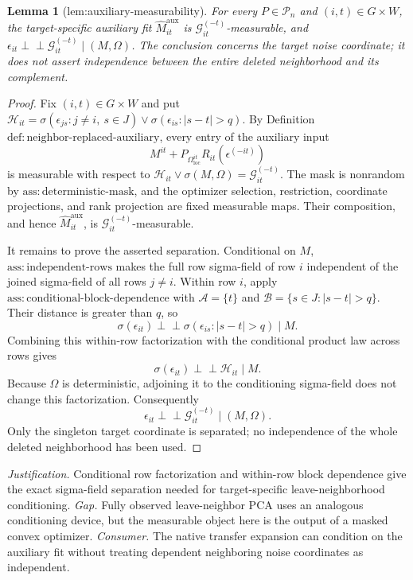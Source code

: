 \documentclass{article}
\newtheorem{lemma}{Lemma}
\begin{document}
\begin{lemma}[lem:auxiliary-measurability]\label{lem:auxiliary-measurability}
For every \(P\in\mathcal P_n\) and \((i,t)\in G\times W\), the target-specific auxiliary fit \(\widehat M^{\mathrm{aux}}_{it}\) is \(\mathcal G_{it}^{(-t)}\)-measurable, and \(\epsilon_{it}\perp\!\!\!\perp\mathcal G_{it}^{(-t)}\mid(M,\Omega)\). The conclusion concerns the target noise coordinate; it does not assert independence between the entire deleted neighborhood and its complement.
\end{lemma}
\begin{proof}
Fix \((i,t)\in G\times W\) and put \(\mathcal H_{it}=\sigma(\epsilon_{js}:j\ne i,\ s\in J)\vee\sigma(\epsilon_{is}:|s-t|>q)\).  By Definition \(\mathrm{def:neighbor\mbox{-}replaced\mbox{-}auxiliary}\), every entry of the auxiliary input
\[
 M^{it}+P_{\Omega_{\mathrm{loc}}^{it}}R_{it}(\epsilon^{(-it)})
\]
is measurable with respect to \(\mathcal H_{it}\vee\sigma(M,\Omega)=\mathcal G_{it}^{(-t)}\).  The mask is nonrandom by \(\mathrm{ass:deterministic\mbox{-}mask}\), and the optimizer selection, restriction, coordinate projections, and rank projection are fixed measurable maps.  Their composition, and hence \(\widehat M^{\mathrm{aux}}_{it}\), is \(\mathcal G_{it}^{(-t)}\)-measurable.

It remains to prove the asserted separation.  Conditional on \(M\), \(\mathrm{ass:independent\mbox{-}rows}\) makes the full row sigma-field of row \(i\) independent of the joined sigma-field of all rows \(j\ne i\).  Within row \(i\), apply \(\mathrm{ass:conditional\mbox{-}block\mbox{-}dependence}\) with \(\mathcal A=\{t\}\) and \(\mathcal B=\{s\in J:|s-t|>q\}\).  Their distance is greater than \(q\), so
\[
 \sigma(\epsilon_{it})\perp\!\!\!\perp
 \sigma(\epsilon_{is}:|s-t|>q)\mid M.
\]
Combining this within-row factorization with the conditional product law across rows gives
\[
 \sigma(\epsilon_{it})\perp\!\!\!\perp\mathcal H_{it}\mid M.
\]
Because \(\Omega\) is deterministic, adjoining it to the conditioning sigma-field does not change this factorization.  Consequently
\[
 \epsilon_{it}\perp\!\!\!\perp\mathcal G_{it}^{(-t)}\mid(M,\Omega).
\]
Only the singleton target coordinate is separated; no independence of the whole deleted neighborhood has been used.
\end{proof}
\par\smallskip\noindent \textit{Justification.} Conditional row factorization and within-row block dependence give the exact sigma-field separation needed for target-specific leave-neighborhood conditioning. \textit{Gap.} Fully observed leave-neighbor PCA uses an analogous conditioning device, but the measurable object here is the output of a masked convex optimizer. \textit{Consumer.} The native transfer expansion can condition on the auxiliary fit without treating dependent neighboring noise coordinates as independent.
\end{document}
